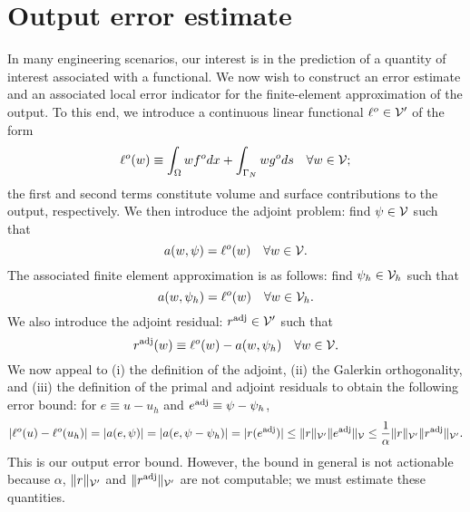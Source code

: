\section{Output error estimate}
In many engineering scenarios, our interest is in the prediction of a quantity of interest associated with a functional. We now wish to construct an error estimate and an associated local error indicator for the finite-element approximation of the output.  To this end, we introduce a continuous linear functional $\ell^o \in \mathcal{V}'$ of the form
\begin{equation*}
  \ell^o(w) \equiv \int_{\Omega} w f^o dx + \int_{\Gamma_N} w g^o ds \quad \forall w \in \mathcal{V};
\end{equation*}
the first and second terms constitute volume and surface contributions to the output, respectively. We then introduce the adjoint problem: find $\psi \in \mathcal{V}$ such that
\begin{equation*}
  a(w,\psi) = \ell^o(w) \quad \forall w \in \mathcal{V}.
\end{equation*}
The associated finite element approximation is as follows: find $\psi_h \in \mathcal{V}_h$ such that
\begin{equation*}
  a(w,\psi_h) = \ell^o(w) \quad \forall w \in \mathcal{V}_h.
\end{equation*}
We also introduce the adjoint residual: $r^{\rm adj} \in \mathcal{V}'$ such that
\begin{equation*}
  r^{\rm adj}(w) \equiv \ell^o(w) - a(w,\psi_h) \quad \forall w \in \mathcal{V}.
\end{equation*}
We now appeal to (i) the definition of the adjoint, (ii) the Galerkin orthogonality, and (iii) the definition of the primal and adjoint residuals to obtain the following error bound: for $e \equiv u - u_h$ and $e^{\rm adj} \equiv \psi - \psi_h$,
\begin{equation*}
  | \ell^o(u) - \ell^o(u_h) | = | a(e,\psi) | = | a (e, \psi - \psi_h) | = | r(e^\text{adj}) |
  \leq \| r \|_{\mathcal{V}'} \| e^\text{adj} \|_{\mathcal{V}}
  \leq \frac{1}{\alpha} \| r \|_{\mathcal{V}'} \| r^\text{adj} \|_{\mathcal{V}'}.
\end{equation*}
This is our output error bound.  However, the bound in general is not actionable because $\alpha$, $\| r \|_{\mathcal{V}'}$ and $\| r^{\rm adj} \|_{\mathcal{V}'}$ are not computable; we must estimate these quantities.

